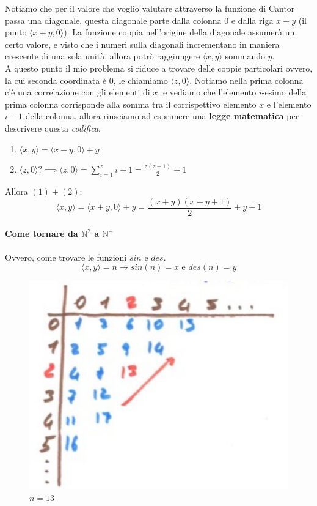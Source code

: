 \documentclass{article}
\begin{document}
Notiamo che per il valore che voglio valutare attraverso la funzione di Cantor passa una diagonale,
questa diagonale parte dalla colonna $0$ e dalla riga $x+y$ (il punto $\langle x+y,0\rangle $). La funzione
coppia nell'origine della diagonale assumerà un certo valore, e visto che i numeri sulla
diagonali incrementano in maniera crescente di una sola unità, allora potrò raggiungere $\langle x,y\rangle $
sommando $y$.\\A questo punto il mio problema si riduce a trovare delle coppie particolari ovvero,
la cui seconda coordinata è $0$, le chiamiamo $\langle z,0\rangle$. Notiamo nella prima colonna
c'è una correlazione con gli elementi di $x$, e vediamo che l'elemento $i$-esimo della prima
colonna corrisponde alla somma tra il corrispettivo elemento $x$ e l'elemento $i-1$ della colonna,
allora riusciamo ad esprimere una \textbf{legge matematica} per descrivere questa \textit{codifica}.

\begin{enumerate}
    \item $\langle x,y\rangle =\langle x+y,0\rangle +y$
    \item $\langle z,0\rangle ? \implies \langle z,0\rangle = \sum_{i=1}^z i+1=\frac{z(z+1)}{2}+1$
\end{enumerate}
\noindent Allora $(1)+(2)$:
$$\langle x,y\rangle = \langle x+y,0\rangle+y=\frac{(x+y)(x+y+1)}{2}+y+1$$

\paragraph{Come tornare da $\mathbb{N}^2$ a $\mathbb{N}^+$}
Ovvero, come trovare le funzioni $sin$ e $des$.
$$\langle x,y \rangle = n \longrightarrow sin(n)=x \text{ e } des(n)=y$$
\begin{figure}
    \centering
    \includegraphics[scale=0.5]{images/coord_dim_2.png}
    \caption{$n=13$}
\end{figure}
\end{document}
